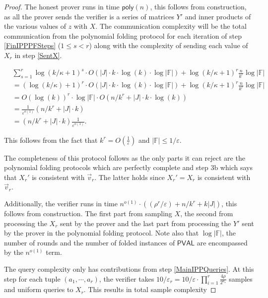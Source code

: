 \documentclass[11pt]{article}
\newcommand{\poly}{\mathsf{poly}}
\newcommand{\PVAL}{\mathsf{PVAL}}
\newcommand{\F}{\mathbb{F}}
\begin{document}
\begin{proof}
 The honest prover runs in time $\poly(n)$, this follows from construction, as all the prover sends the verifier is a series of matrices $Y'$ and inner products of the various values of $z$ with $X$. The communication complexity will be the total communication from the polynomial folding protocol for each iteration of step \ref{FinIPPPFSteps} ($1\leq s<r$) along with the complexity of sending each value of $X_{r}$ in step \ref{SentX}.

\[
\begin{split}
    &\sum_{s=1}^{r}\log(k/\kappa+1)^{s}\cdot O(|J|\cdot k\cdot\log (k)\cdot \log \vert \F \vert)+\log(k/\kappa+1)^{r}\frac{n}{k^{r}}\log |\F|\\
    &=(\log(k/\kappa)+1)^{r}\cdot O(|J|\cdot k\cdot\log (k)\cdot \log \vert \F \vert)+\log(k/\kappa+1)^{r}\frac{n}{k^{r}}\log |\F|\\
    &=O(\log(k))^{r} \cdot \log \vert \F \vert \cdot O(n/k^{r}+|J|\cdot k\cdot \log (k))\\
    &=\frac{1}{\varepsilon^{o(1)}}(n/k^{r}+|J|\cdot k)\\
    &=(n/k^{r}+|J|\cdot k)\frac{1}{\varepsilon^{o(1)}}.
\end{split}
\]

\noindent This follows from the fact that $k^{r}=O\left(\frac{1}{\varepsilon}\right)$ and $|\F|\leq 1/\varepsilon$.

The completeness of this protocol follows as the only parts it can reject are the polynomial folding protocols which are perfectly complete and step 3b which says that $X_{r}'$ is consistent with $\vec{v}_{r}$. The latter holds since $X_{r}'=X_{r}$ is consistent with $\vec{v}_{r}$. 

Additionally, the verifier runs in time $n^{o(1)} \cdot ((\rho^{r}/\varepsilon) + n/k^{r} + k\vert J\vert)$, this follows from construction. The first part from sampling $X$, the second from processing the $X_{r}$ sent by the prover and the last part from processing the $Y'$ sent by the prover in the polynomial folding protocol. Note also that $\log |\F|$, the number of rounds and the number of folded instances of $\PVAL$ are encompassed by the $n^{o(1)}$ term.

The query complexity only has contributions from step \ref{MainIPPQueries}. At this step for each tuple $(a_{1},\cdots,a_{r})$, the verifier takes $10/\varepsilon_{r}=10/\varepsilon \cdot \prod_{i=1}^r \frac{4\rho}{2^{a_{s}}}$ samples and uniform queries to $X_{r}$. This results in total sample complexity


\end{proof}
\end{document}

